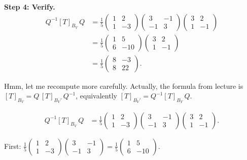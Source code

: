 \documentclass{article}
\begin{document}
\begin{mdframed}[linewidth=1pt]
\medskip
\textbf{Step 4: Verify.}
\begin{align*}
Q^{-1}[T]_{B_V}\, Q
&= \frac{1}{5}\begin{pmatrix} 1 & 2 \\ 1 & -3 \end{pmatrix}
\begin{pmatrix} 3 & -1 \\ -1 & 3 \end{pmatrix}
\begin{pmatrix} 3 & 2 \\ 1 & -1 \end{pmatrix} \\
&= \frac{1}{5}\begin{pmatrix} 1 & 5 \\ 6 & -10 \end{pmatrix}
\begin{pmatrix} 3 & 2 \\ 1 & -1 \end{pmatrix} \\
&= \frac{1}{5}\begin{pmatrix} 8 & -3 \\ 8 & 22 \end{pmatrix}.
\end{align*}

Hmm, let me recompute more carefully. Actually, the formula from lecture is $[T]_{B_V} = Q\,[T]_{B_V'}\,Q^{-1}$, equivalently $[T]_{B_V'} = Q^{-1}[T]_{B_V}\,Q$.

\begin{align*}
Q^{-1}[T]_{B_V}\,Q &= \frac{1}{5}\begin{pmatrix} 1 & 2 \\ 1 & -3 \end{pmatrix}\begin{pmatrix} 3 & -1 \\ -1 & 3 \end{pmatrix}\begin{pmatrix} 3 & 2 \\ 1 & -1 \end{pmatrix}.
\end{align*}

First: $\frac{1}{5}\begin{pmatrix} 1 & 2 \\ 1 & -3 \end{pmatrix}\begin{pmatrix} 3 & -1 \\ -1 & 3 \end{pmatrix} = \frac{1}{5}\begin{pmatrix} 1 & 5 \\ 6 & -10 \end{pmatrix}$.


\end{mdframed}
\end{document}
